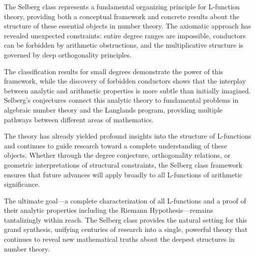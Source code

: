 The Selberg class represents a fundamental organizing principle for L-function theory, providing both a conceptual framework and concrete results about the structure of these essential objects in number theory. The axiomatic approach has revealed unexpected constraints: entire degree ranges are impossible, conductors can be forbidden by arithmetic obstructions, and the multiplicative structure is governed by deep orthogonality principles.

The classification results for small degrees demonstrate the power of this framework, while the discovery of forbidden conductors shows that the interplay between analytic and arithmetic properties is more subtle than initially imagined. Selberg's conjectures connect this analytic theory to fundamental problems in algebraic number theory and the Langlands program, providing multiple pathways between different areas of mathematics.

The theory has already yielded profound insights into the structure of L-functions and continues to guide research toward a complete understanding of these objects. Whether through the degree conjecture, orthogonality relations, or geometric interpretations of structural constraints, the Selberg class framework ensures that future advances will apply broadly to all L-functions of arithmetic significance.

The ultimate goal---a complete characterization of all L-functions and a proof of their analytic properties including the Riemann Hypothesis---remains tantalizingly within reach. The Selberg class provides the natural setting for this grand synthesis, unifying centuries of research into a single, powerful theory that continues to reveal new mathematical truths about the deepest structures in number theory.